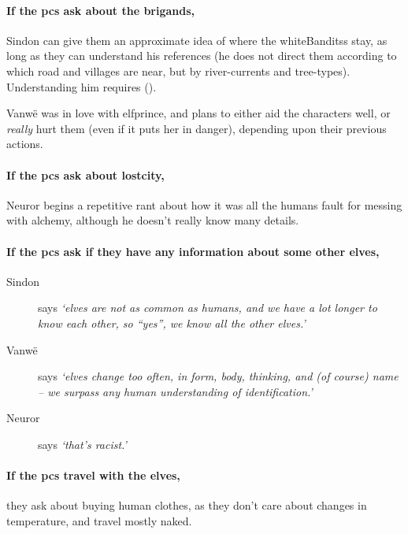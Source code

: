 
\paragraph{If the \glspl{pc} ask about the brigands,}
Sindon can give them an approximate idea of where the \glspl{whiteBandits} stay, as long as they can understand his references (he does not direct them according to which road and \glspl{village} are near, but by river-currents and tree-types).
Understanding him requires  (\tn[10]).



Vanw\"e was in love with \gls{elfprince}, and plans to either aid the characters well, or \emph{really} hurt them (even if it puts her in danger), depending upon their previous actions.

\label{neuror}


\paragraph{If the \glspl{pc} ask about \gls{lostcity},}
Neuror begins a repetitive rant about how it was all the humans fault for messing with alchemy, although he doesn't really know many details.

\paragraph{If the \glspl{pc} ask if they have any information about some other elves,}

\begin{description}
  \item[Sindon] says \textit{`elves are not as common as humans, and we have a lot longer to know each other, so ``yes'', we know all the other elves.'}
  \item[Vanw\"e] says \textit{`elves change too often, in form, body, thinking, and (of course) name -- we surpass any human understanding of identification.'}
  \item[Neuror] says \textit{`that's racist.'}
\end{description}

\paragraph{If the \glspl{pc} travel with the elves,}
they ask about buying human clothes, as they don't care about changes in temperature, and travel mostly naked.%
